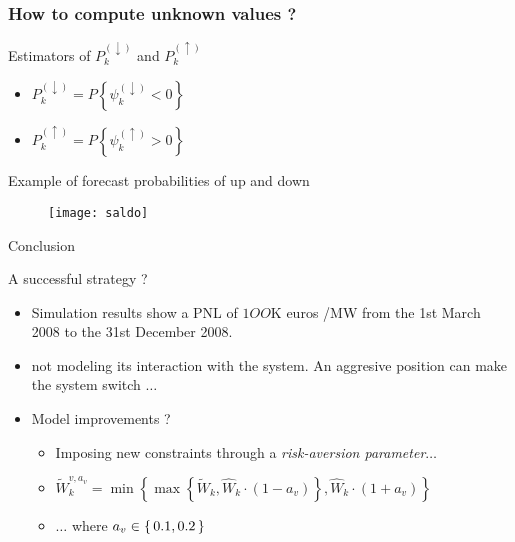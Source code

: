 \begin{frame}\frametitle{How to compute unknown values ?}
\begin{block}{Estimators of $P _ { k } ^ { ( \downarrow ) }$ and $P _ { k } ^ { ( \uparrow ) }$}
  \begin{itemize}
    \item $P _ { k } ^ { ( \downarrow ) } = P \left\{ \psi _ { k } ^ { ( \downarrow ) } < 0 \right\}$
    \item $P _ { k } ^ { ( \uparrow ) } = P \left\{ \psi _ { k } ^ { ( \uparrow ) } > 0 \right\}$
  \end{itemize}
\end{block}

\begin{exampleblock}{Example of forecast probabilities of up and down}
  \begin{figure}
    \centering
      \texttt{[image: saldo]}
  \end{figure}
\end{exampleblock}
\end{frame}

\begin{frame}{Conclusion}
\begin{block}{A successful strategy ?}
  \begin{itemize}
  \item Simulation results show a PNL of $1OO$K euros /MW from the
  1st March 2008 to the 31st December 2008.
  \item not modeling its interaction with the system. An aggresive position can
  make the system switch $\ldots$
  \item Model improvements ?
  \begin{itemize}
    \item Imposing new constraints through a \textit{risk-aversion parameter}$\ldots$
    \item $\widetilde { W } _ { k } ^ { v , a _ { v } } = \min \left\{ \max \left\{ \widetilde { W } _ { k } , \widehat { W } _ { k } \cdot \left( 1 - a _ { v } \right) \right\} , \widehat { W } _ { k } \cdot \left( 1 + a _ { v } \right) \right\}$
    \item $\ldots$ where $a _ { v }\in \left \{ \, 0.1, 0.2 \, \right \}$
  \end{itemize}
  \end{itemize}
\end{block}
\end{frame}
